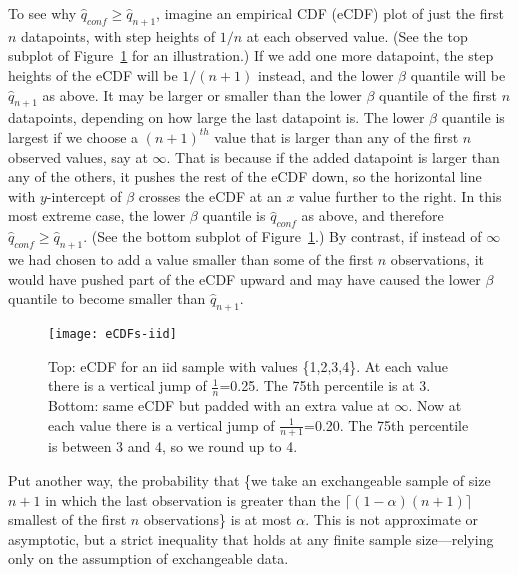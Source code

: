 \documentclass[10.5pt, letterpaper]{article}
\numberwithin{table}{section}
\numberwithin{figure}{section}
\numberwithin{equation}{section}
\begin{document}
To see why $\hat q_{conf} \geq \hat q_{n+1}$, imagine an empirical CDF (eCDF) plot of just the first $n$ datapoints, with step heights of $1/n$ at each observed value.
(See the top subplot of Figure~\ref{fig:eCDFs-iid} for an illustration.)
If we add one more datapoint, the step heights of the eCDF will be $1/(n+1)$ instead, and the lower $\beta$ quantile will be $\hat q_{n+1}$ as above. It may be larger or smaller than the lower $\beta$ quantile of the first $n$ datapoints, depending on how large the last datapoint is. The lower $\beta$ quantile is largest if we choose a $(n+1)^{th}$ value that is larger than any of the first $n$ observed values, say at $\infty$. That is because if the added datapoint is larger than any of the others, it pushes the rest of the eCDF down, so the horizontal line with $y$-intercept of $\beta$ crosses the eCDF at an $x$ value further to the right. In this most extreme case, the lower $\beta$ quantile is $\hat q_{conf}$ as above, and therefore $\hat q_{conf} \geq \hat q_{n+1}$.
(See the bottom subplot of Figure~\ref{fig:eCDFs-iid}.)
By contrast, if instead of $\infty$ we had chosen to add a value smaller than some of the first $n$ observations, it would have pushed part of the eCDF upward and may have caused the lower $\beta$ quantile to become smaller than $\hat q_{n+1}$.

\begin{figure}[h!]
\texttt{[image: eCDFs-iid]}
\centering
\caption{Top: eCDF for an iid sample with values \{1,2,3,4\}. At each value there is a vertical jump of $\frac{1}{n}$=0.25. The 75th percentile is at 3. \\ Bottom: same eCDF but padded with an extra value at $\infty$. Now at each value there is a vertical jump of $\frac{1}{n+1}$=0.20. The 75th percentile is between 3 and 4, so we round up to 4.}
\label{fig:eCDFs-iid}
\end{figure}

Put another way, the probability that \{we take an exchangeable sample of size $n+1$ in which the last observation is greater than the $\lceil (1-\alpha)(n+1) \rceil$ smallest of the first $n$ observations\} is at most $\alpha$. This is not approximate or asymptotic, but a strict inequality that holds at any finite sample size---relying only on the assumption of exchangeable data.
\end{document}
